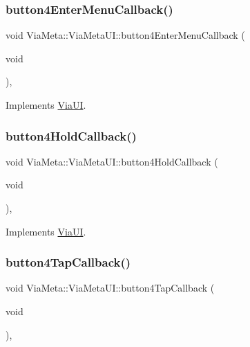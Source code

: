 \subsubsection{\texorpdfstring{button4\+Enter\+Menu\+Callback()}{button4EnterMenuCallback()}}
{\footnotesize\ttfamily void Via\+Meta\+::\+Via\+Meta\+U\+I\+::button4\+Enter\+Menu\+Callback (\begin{DoxyParamCaption}\item[{void}]{ }\end{DoxyParamCaption})\hspace{0.3cm}{\ttfamily [override]}, {\ttfamily [virtual]}}



Implements \mbox{\hyperlink{class_via_u_i_a6db24e53e559b6fddd4cb1f918de40d6}{Via\+UI}}.

\mbox{\label{class_via_meta_1_1_via_meta_u_i_aa43b104c1a726fad1c530cb50eb305f6}} 
\subsubsection{\texorpdfstring{button4\+Hold\+Callback()}{button4HoldCallback()}}
{\footnotesize\ttfamily void Via\+Meta\+::\+Via\+Meta\+U\+I\+::button4\+Hold\+Callback (\begin{DoxyParamCaption}\item[{void}]{ }\end{DoxyParamCaption})\hspace{0.3cm}{\ttfamily [override]}, {\ttfamily [virtual]}}



Implements \mbox{\hyperlink{class_via_u_i_a11919091b39319fe4d1b3a3f3c7104c5}{Via\+UI}}.

\mbox{\label{class_via_meta_1_1_via_meta_u_i_a0c745451e4e0b8bc51546280595b5b28}} 
\subsubsection{\texorpdfstring{button4\+Tap\+Callback()}{button4TapCallback()}}
{\footnotesize\ttfamily void Via\+Meta\+::\+Via\+Meta\+U\+I\+::button4\+Tap\+Callback (\begin{DoxyParamCaption}\item[{void}]{ }\end{DoxyParamCaption})\hspace{0.3cm}{\ttfamily [override]}, {\ttfamily [virtual]}}



